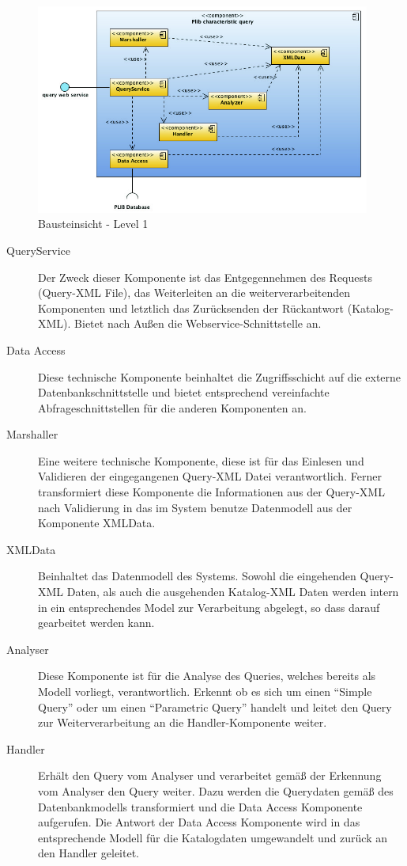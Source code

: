 \begin{figure}[htbp]
	\centering
		\includegraphics[width=0.98\textwidth]{images/bausteinsicht_plib_level1.jpg}
	\caption{Bausteinsicht - Level 1}
	\label{fig:bausteinsicht_level1}
\end{figure}

\begin{description}
\item[QueryService] Der Zweck dieser Komponente ist das Entgegennehmen des Requests (Query-XML File), das Weiterleiten an die weiterverarbeitenden Komponenten und letztlich das Zurücksenden der Rückantwort (Katalog-XML). Bietet nach Außen die \gls{Webservice}-Schnittstelle an.
\item[Data Access] Diese technische Komponente beinhaltet die Zugriffsschicht auf die externe Datenbankschnittstelle und bietet entsprechend vereinfachte Abfrageschnittstellen für die anderen Komponenten an. 
\item[Marshaller] Eine weitere technische Komponente, diese ist für das Einlesen und Validieren der eingegangenen Query-XML Datei verantwortlich. Ferner transformiert diese Komponente die Informationen aus der Query-XML nach Validierung in das im System benutze Datenmodell aus der Komponente XMLData.
\item[XMLData] Beinhaltet das Datenmodell des Systems. Sowohl die eingehenden Query-XML Daten, als auch die ausgehenden Katalog-XML Daten werden intern in ein entsprechendes Model zur Verarbeitung abgelegt, so dass darauf gearbeitet werden kann.  
\item[Analyser] Diese Komponente ist für die Analyse des Queries, welches bereits als Modell vorliegt, verantwortlich. Erkennt ob es sich um einen \enquote{Simple Query} oder um einen \enquote{Parametric Query} handelt und leitet den Query zur Weiterverarbeitung an die Handler-Komponente weiter. 
\item[Handler] Erhält den Query vom Analyser und verarbeitet gemäß der Erkennung vom Analyser den Query weiter. Dazu werden die Querydaten gemäß des Datenbankmodells transformiert und die Data Access Komponente aufgerufen. Die Antwort der Data Access Komponente wird in das entsprechende Modell für die Katalogdaten umgewandelt und zurück an den Handler geleitet.  
\end{description}


